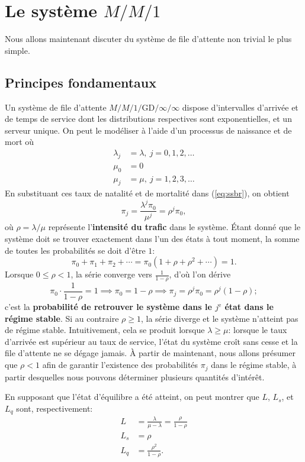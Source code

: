 \section{Le système $M/M/1$}
Nous allons maintenant discuter du système de file d'attente non trivial le plus simple.  
\subsection{Principes fondamentaux} Un système de file d'attente $M/M/1/\textrm{GD}/\infty/\infty$  dispose d'intervalles d'arrivée et de temps de service dont les distributions respectives sont exponentielles, et un serveur unique. On peut le modéliser à l'aide d'un processus de naissance et de mort où
\begin{align*}
\lambda_{j} &= \lambda, \ j=0,1,2,\ldots \\ 
\mu_{0} &= 0 \\
\mu_{j} &= \mu,\  j=1,2,3,\ldots 
\end{align*}
En substituant ces taux de natalité et de mortalité dans (\ref{eq:ssbr}), on obtient  
$$\pi_{j} = \frac{\lambda^{j} \pi_{0}}{\mu^{j}}=\rho^j \pi_0,$$ où $\rho = \lambda/\mu$ représente l'\textbf{intensité du trafic} dans le système. \newpage\noindent 
Étant donné que le système doit se trouver exactement dans l'un des états à tout moment, la somme de toutes les probabilités se doit d'\^etre $1$: $$\pi_{0}+\pi_1 + \pi_2+\cdots = \pi_0(1+\rho+\rho^{2}+\cdots ) = 1.$$
Lorsque $0 \leq \rho < 1$, la série converge vers $\frac{1}{1-\rho}$, d'où l'on dérive $$\pi_{0}\cdot \frac{1}{1-\rho} = 1 \implies \pi_0 = 1-\rho \implies \pi_{j} = \rho^{j} \pi_0 = \rho^j (1-\rho);$$
c'est la \textbf{probabilité de retrouver le système  dans le  $j^{\text{e}}$ état dans le régime stable}. Si au contraire $\rho \geq 1$, la série diverge et le système n'atteint pas de régime stable. Intuitivement, cela se produit lorsque $\lambda \geq \mu$: lorsque le taux d'arrivée est supérieur au taux de service, l'état du système croît sans cesse et la file d'attente ne se dégage jamais.
\newl À partir de maintenant, nous allons présumer que $\rho < 1$ afin de garantir l'existence des probabilités  $\pi_{j}$ dans le régime stable, à partir desquelles nous pouvons déterminer plusieurs quantités d'intérêt. \par En supposant que l'état d'équilibre a été atteint, on peut montrer que $L$, $L_{s}$, et $L_{q}$ sont, respectivement:
\begin{align*}
L &= \frac{\lambda}{\mu - \lambda}=\frac{\rho}{1-\rho}\\
L_{s} &= \rho\\
 L_{q} &= \frac{\rho^{2}}{1-\rho}.
 \end{align*}
